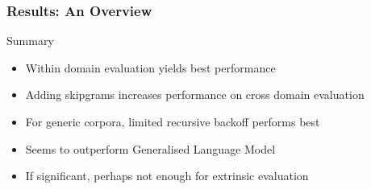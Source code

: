 \documentclass[11pt,t]{beamer}
\begin{document}
\begin{frame}
    \frametitle{Results: An Overview}
    \begin{block}{Summary}
        \begin{itemize}
            \item Within domain evaluation yields best performance
            \item Adding skipgrams increases performance on cross domain evaluation
            \item For generic corpora, limited recursive backoff performs best
            \item Seems to outperform Generalised Language Model
            \item If significant, perhaps not enough for extrinsic evaluation
        \end{itemize}
    \end{block}
\end{frame}
\end{document}
